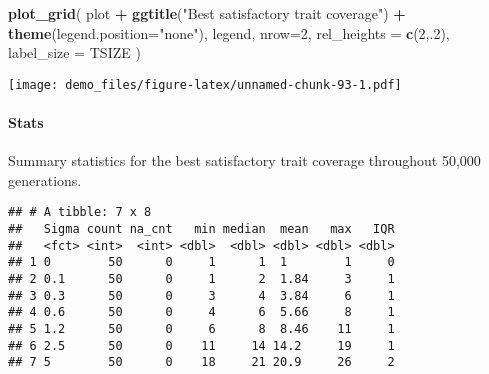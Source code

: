 \documentclass[]{book}
\newenvironment{Shaded}{\begin{snugshade}}{\end{snugshade}}
\newcommand{\DataTypeTok}[1]{\textcolor[rgb]{0.13,0.29,0.53}{#1}}
\newcommand{\DecValTok}[1]{\textcolor[rgb]{0.00,0.00,0.81}{#1}}
\newcommand{\KeywordTok}[1]{\textcolor[rgb]{0.13,0.29,0.53}{\textbf{#1}}}
\newcommand{\NormalTok}[1]{#1}
\newcommand{\OperatorTok}[1]{\textcolor[rgb]{0.81,0.36,0.00}{\textbf{#1}}}
\newcommand{\OtherTok}[1]{\textcolor[rgb]{0.56,0.35,0.01}{#1}}
\newcommand{\StringTok}[1]{\textcolor[rgb]{0.31,0.60,0.02}{#1}}
\let\oldparagraph\paragraph
\renewcommand{\paragraph}[1]{\oldparagraph{#1}\mbox{}}
\begin{document}
\begin{Shaded}
\begin{Highlighting}[]
\KeywordTok{plot_grid}\NormalTok{(}
\NormalTok{  plot }\OperatorTok{+}
\StringTok{    }\KeywordTok{ggtitle}\NormalTok{(}\StringTok{"Best satisfactory trait coverage"}\NormalTok{) }\OperatorTok{+}
\StringTok{    }\KeywordTok{theme}\NormalTok{(}\DataTypeTok{legend.position=}\StringTok{"none"}\NormalTok{),}
\NormalTok{  legend,}
  \DataTypeTok{nrow=}\DecValTok{2}\NormalTok{,}
  \DataTypeTok{rel_heights =} \KeywordTok{c}\NormalTok{(}\DecValTok{2}\NormalTok{,.}\DecValTok{2}\NormalTok{),}
  \DataTypeTok{label_size =}\NormalTok{ TSIZE}
\NormalTok{)}
\end{Highlighting}
\end{Shaded}

\texttt{[image: demo\_files/figure-latex/unnamed-chunk-93-1.pdf]}

\hypertarget{stats-55}{%
\paragraph{Stats}\label{stats-55}}

Summary statistics for the best satisfactory trait coverage throughout 50,000 generations.

\begin{Shaded}
\end{Shaded}

\begin{verbatim}
## # A tibble: 7 x 8
##   Sigma count na_cnt   min median  mean   max   IQR
##   <fct> <int>  <int> <dbl>  <dbl> <dbl> <dbl> <dbl>
## 1 0        50      0     1      1  1        1     0
## 2 0.1      50      0     1      2  1.84     3     1
## 3 0.3      50      0     3      4  3.84     6     1
## 4 0.6      50      0     4      6  5.66     8     1
## 5 1.2      50      0     6      8  8.46    11     1
## 6 2.5      50      0    11     14 14.2     19     1
## 7 5        50      0    18     21 20.9     26     2
\end{verbatim}
\end{document}
